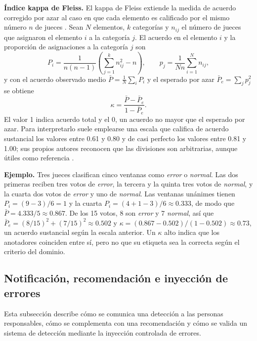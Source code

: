 \textbf{Índice kappa de Fleiss.} El kappa de Fleiss extiende la medida de acuerdo corregido por azar al caso en que cada elemento es calificado por el mismo número $n$ de jueces \cite{fleiss1971_kappa}. Sean $N$ elementos, $k$ categorías y $n_{ij}$ el número de jueces que asignaron el elemento $i$ a la categoría $j$. El acuerdo en el elemento $i$ y la proporción de asignaciones a la categoría $j$ son
\begin{equation}
P_i = \frac{1}{n(n-1)} \left( \sum_{j=1}^{k} n_{ij}^2 - n \right), \qquad p_j = \frac{1}{N n} \sum_{i=1}^{N} n_{ij},
\end{equation}
y con el acuerdo observado medio $\bar{P} = \frac{1}{N}\sum_i P_i$ y el esperado por azar $\bar{P}_e = \sum_j p_j^2$ se obtiene
\begin{equation}
\kappa = \frac{\bar{P} - \bar{P}_e}{1 - \bar{P}_e}.
\end{equation}
El valor 1 indica acuerdo total y el 0, un acuerdo no mayor que el esperado por azar. Para interpretarlo suele emplearse una escala que califica de acuerdo sustancial los valores entre 0.61 y 0.80 y de casi perfecto los valores entre 0.81 y 1.00; sus propios autores reconocen que las divisiones son arbitrarias, aunque útiles como referencia \cite{landis1977_kappa}.

\textbf{Ejemplo.} Tres jueces clasifican cinco ventanas como \emph{error} o \emph{normal}. Las dos primeras reciben tres votos de \emph{error}, la tercera y la quinta tres votos de \emph{normal}, y la cuarta dos votos de \emph{error} y uno de \emph{normal}. Las ventanas unánimes tienen $P_i = (9 - 3)/6 = 1$ y la cuarta $P_i = (4 + 1 - 3)/6 \approx 0.333$, de modo que $\bar{P} = 4.333/5 \approx 0.867$. De los 15 votos, 8 son \emph{error} y 7 \emph{normal}, así que $\bar{P}_e = (8/15)^2 + (7/15)^2 \approx 0.502$ y $\kappa = (0.867 - 0.502)/(1 - 0.502) \approx 0.73$, un acuerdo sustancial según la escala anterior. Un $\kappa$ alto indica que los anotadores coinciden entre sí, pero no que su etiqueta sea la correcta según el criterio del dominio.

\subsection{Notificación, recomendación e inyección de errores}\label{sec:mt_reaccion}

Esta subsección describe cómo se comunica una detección a las personas responsables, cómo se complementa con una recomendación y cómo se valida un sistema de detección mediante la inyección controlada de errores.

